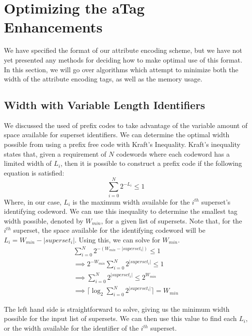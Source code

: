 \section{Optimizing the aTag Enhancements}
We have specified the format of our attribute encoding scheme, but we have not yet presented any methods for deciding how to make optimal use of this format. In this section, we will go over algorithms which attempt to minimize both the width of the attribute encoding tags, as well as the memory usage. 

\subsection{Width with Variable Length Identifiers}
We discussed the used of prefix codes to take advantage of the variable amount of space available for superset identifiers. We can determine the optimal width possible from using a prefix free code with Kraft's Inequality. Kraft's inequality states that, given a requirement of $N$ codewords where each codeword has a limited width of $L_i$, then it is possible to construct a prefix code if the following equation is satisfied:
$$ \sum_{i = 0}^{N}{2^{-L_i} \le 1} $$
Where, in our case, $L_i$ is the maximum width available for the $i^{th}$ superset's identifying codeword. We can use this inequality to determine the smallest tag width possible, denoted by $W_{min}$, for a given list of supersets. Note that, for the $i^{th}$ superset, the space available for the identifying codeword will be $L_i = W_{min} - |superset_i|$. Using this, we can solve for $W_{min}$.\\

\begin{equation} \label{eq1}
 \begin{split}
  \sum_{i = 0}^{N}{2^{-(W_{min} - |superset_i|)}}   \le  1 \\
  \implies 2^{-W_{min}} \sum_{i = 0}^{N}{2^{|superset_i|}}   \le  1 \\
  \implies  \sum_{i = 0}^{N}{2^{|superset_i|}}   \le  2^{W_{min}} \\
 \implies   \lceil\log_2{\sum_{i = 0}^{N}{2^{|superset_i|}}}\rceil  =  W_{min}
\end{split}
 \end{equation}
 
 The left hand side is straightforward to solve, giving us the minimum width possible for the input list of supersets. We can then use this value to find each $L_i$, or the width available for the identifier of the $i^{th}$ superset.
 
